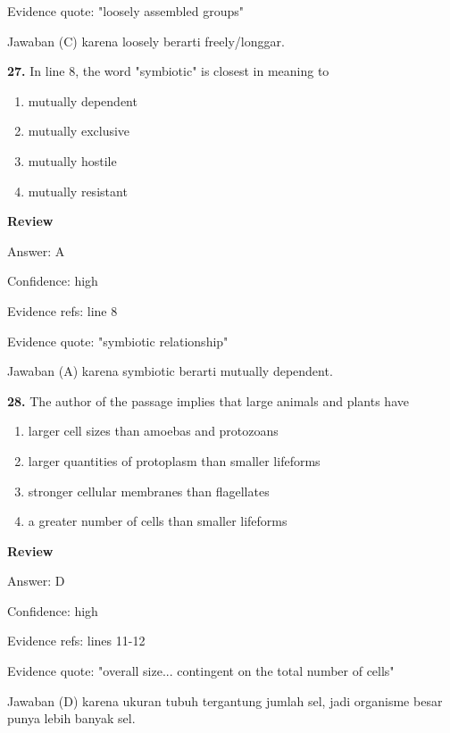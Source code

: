 \documentclass[12pt]{article}
\begin{document}
Evidence quote: "loosely assembled groups"\par
Jawaban (C) karena loosely berarti freely/longgar.\par
\endgroup
\par
\vspace{0.25\baselineskip}
\noindent\textbf{27.} In line 8, the word "symbiotic" is closest in meaning to
\begin{enumerate}[label=(\Alph*),leftmargin=*,itemsep=0.2em]
\item mutually dependent
\item mutually exclusive
\item mutually hostile
\item mutually resistant
\end{enumerate}
\par
\begingroup
\setlength{\parskip}{0pt}
\setlength{\parindent}{0pt}
\textbf{Review}\par
Answer: A\par
Confidence: high\par
Evidence refs: line 8\par
Evidence quote: "symbiotic relationship"\par
Jawaban (A) karena symbiotic berarti mutually dependent.\par
\endgroup
\par
\vspace{0.25\baselineskip}
\noindent\textbf{28.} The author of the passage implies that large animals and plants have
\begin{enumerate}[label=(\Alph*),leftmargin=*,itemsep=0.2em]
\item larger cell sizes than amoebas and protozoans
\item larger quantities of protoplasm than smaller lifeforms
\item stronger cellular membranes than flagellates
\item a greater number of cells than smaller lifeforms
\end{enumerate}
\par
\begingroup
\setlength{\parskip}{0pt}
\setlength{\parindent}{0pt}
\textbf{Review}\par
Answer: D\par
Confidence: high\par
Evidence refs: lines 11-12\par
Evidence quote: "overall size... contingent on the total number of cells"\par
Jawaban (D) karena ukuran tubuh tergantung jumlah sel, jadi organisme besar punya lebih banyak sel.\par
\end{document}
